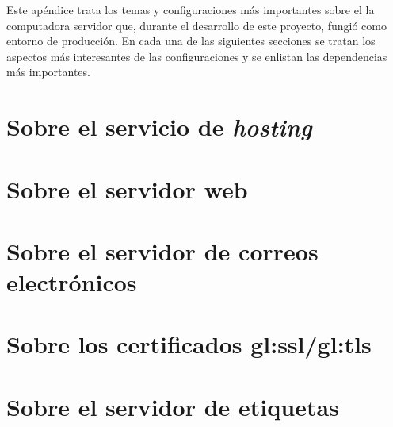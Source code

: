 %
%

%
%
Este apéndice trata los temas y configuraciones más importantes sobre el
la computadora servidor que, durante el desarrollo de este proyecto, fungió
como entorno de producción. En cada una de las siguientes secciones se tratan
los aspectos más interesantes de las configuraciones y se enlistan las
dependencias más importantes.

\section{Sobre el servicio de \textit{hosting}}

\section{Sobre el servidor web}

\section{Sobre el servidor de correos electrónicos}

\section{Sobre los certificados \texorpdfstring{%
  \acrshort{gl:ssl}/\acrshort{gl:tls}}{SSL/TLS}}

\section{Sobre el servidor de etiquetas}
